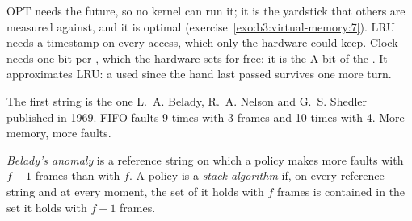 OPT needs the future, so no kernel can run it; it is the yardstick that others are measured against, and it is optimal (exercise~\ref{exo:b3:virtual-memory:7}). LRU needs a timestamp on every access, which only the hardware could keep. Clock needs one bit per , which the hardware sets for free: it is the A bit of the . It approximates LRU: a  used since the hand last passed survives one more turn.

\label{lst:b3:virtual-memory:fifo}

\label{lst:b3:virtual-memory:clock}

\label{out:b3:virtual-memory:replace}

The first string is the one L.~A. Belady, R.~A. Nelson and G.~S. Shedler published in 1969. %
FIFO faults 9 times with 3 frames and 10 times with 4. More memory, more faults.

\begin{definition}\label{def:b3:virtual-memory:belady}
\emph{Belady's anomaly} is a reference string on which a policy makes more faults with $f + 1$ frames than with $f$. A policy is a \emph{stack algorithm} if, on every reference string and at every moment, the set of  it holds with $f$ frames is contained in the set it holds with $f + 1$ frames.
\end{definition}

